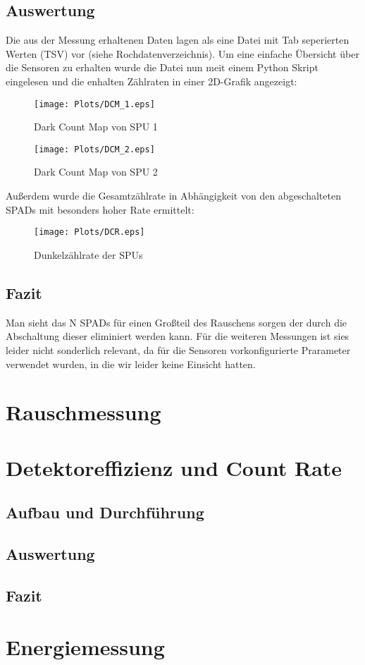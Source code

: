 \documentclass[12pt,twoside,a4paper]{scrartcl}
\begin{document}
		\subsection{Auswertung}

			Die aus der Messung erhaltenen Daten lagen als eine Datei mit Tab seperierten Werten (TSV) vor (siehe Rochdatenverzeichnis). Um eine einfache Übersicht über die Sensoren zu erhalten wurde die Datei nun meit einem Python Skript eingelesen und die enhalten Zählraten in einer 2D-Grafik angezeigt:

			\begin{figure*}[H]
				\begin{minipage}{0.49 \textwidth}
					\texttt{[image: Plots/DCM\_1.eps]}
					\caption{Dark Count Map von SPU 1}
				\end{minipage}
				\begin{minipage}{0.49 \textwidth}
					\texttt{[image: Plots/DCM\_2.eps]}
					\caption{Dark Count Map von SPU 2}
				\end{minipage}
			\end{figure*} 

			Außerdem wurde die Gesamtzählrate in Abhängigkeit von den abgeschalteten SPADs mit besonders hoher Rate ermittelt:

			\begin{figure*}[H]
				\texttt{[image: Plots/DCR.eps]}
				\caption{Dunkelzählrate der SPUs}
			\end{figure*}

		\subsection{Fazit}

		Man sieht das N SPADs für einen Großteil des Rauschens sorgen der durch die Abschaltung dieser eliminiert werden kann. Für die weiteren Messungen ist sies leider nicht sonderlich relevant, da für die Sensoren vorkonfigurierte Prarameter verwendet wurden, in die wir leider keine Einsicht hatten.

	\section{Rauschmessung}
	

	\section{Detektoreffizienz und Count Rate}

		\subsection{Aufbau und Durchführung}

		\subsection{Auswertung}

		\subsection{Fazit}

	\section{Energiemessung}
\end{document}
